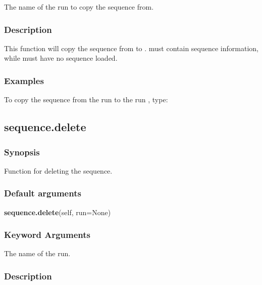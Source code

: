   The name of the run to copy the sequence from.


\subsubsection{Description}

This function will copy the sequence from 
 to 
.  
 must contain sequence
information, while 
 must have no sequence loaded.


\subsubsection{Examples}

To copy the sequence from the run 
 to the run 
, type:





\newpage

\subsection{sequence.delete}


\subsubsection{Synopsis}

Function for deleting the sequence.

\subsubsection{Default arguments}

\textsf{\textbf{sequence.delete}(self, run=None)}


\subsubsection{Keyword Arguments}

  The name of the run.

\subsubsection{Description}

